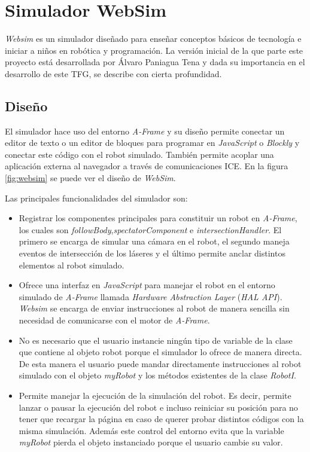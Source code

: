 \section{Simulador WebSim}

\textit{Websim} es un simulador diseñado para enseñar conceptos básicos de tecnología e iniciar a niños en robótica y programación. La versión inicial de la que parte este proyecto está desarrollada por Álvaro Paniagua Tena\cite{bib:alvaro} y dada su  importancia en el desarrollo de este TFG, se describe con cierta profundidad.  

\subsection{Diseño}
\label{subsec:design}
El simulador hace uso del entorno \textit{A-Frame} y su diseño permite conectar un editor de texto o un editor de bloques para  programar en \textit{JavaScript} o \textit{Blockly} y conectar este código con el robot simulado. También permite acoplar una aplicación externa al navegador a través de comunicaciones ICE. En la figura \ref{fig:websim} se puede ver el diseño de \textit{WebSim}.

Las principales funcionalidades del simulador son: 

\begin{itemize}
    \item Registrar los componentes principales para constituir un robot en \textit{A-Frame}, los cuales son \textit{followBody},\textit{spectatorComponent} e \textit{intersectionHandler}. El primero se encarga de simular una cámara en el robot, el segundo maneja eventos de intersección de los láseres y el último permite anclar distintos elementos al robot simulado. 
    
    \item Ofrece una interfaz en \textit{JavaScript} para manejar el robot en el entorno simulado de \textit{A-Frame} llamada \textit{Hardware Abstraction Layer} (\textit{HAL API}). \textit{Websim} se encarga de enviar instrucciones al robot de manera sencilla sin necesidad de comunicarse con el motor de \textit{A-Frame}. 
    
    \item No es necesario que el usuario instancie ningún tipo de variable de la clase que contiene al objeto robot porque el simulador lo ofrece de manera directa. De esta manera el usuario puede mandar directamente instrucciones al robot simulado con el objeto \textit{myRobot} y los métodos existentes de la clase \textit{RobotI}.
    
    \item Permite manejar la ejecución de la simulación del robot. Es decir, permite lanzar o pausar la ejecución del robot e incluso reiniciar su posición para no tener que recargar la página en caso de querer probar distintos códigos con la misma simulación. Además este control del entorno evita que la variable \textit{myRobot} pierda el objeto instanciado porque el usuario cambie su valor.
    
\end{itemize}

